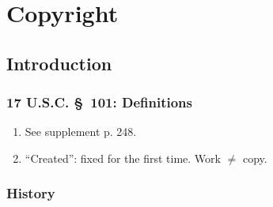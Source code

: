 \section{Copyright}

\subsection{Introduction}

\subsubsection{17 U.S.C. \S\ 101: Definitions}

\begin{enumerate}
    \item See supplement p. 248.
    \item ``Created'': fixed for the first time. Work $\neq$ copy.
\end{enumerate}

\subsubsection{History}

